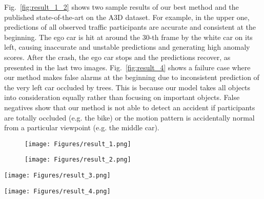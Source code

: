 \documentclass[letterpaper, 10 pt, conference]{ieeeconf}
\theoremstyle{definition}
\theoremstyle{remark}
\begin{document}
Fig.~\ref{fig:result_1_2} shows
two sample results of our best method and the published state-of-the-art on the A3D
dataset. For example, in the upper one, predictions of all observed
traffic participants are accurate and consistent at the beginning.
The ego car is hit at around the $30$-th frame by the white car on its
left, causing inaccurate and unstable predictions and generating
high anomaly scores. After the crash, the ego car stops and the
predictions recover, as presented in the last two images. Fig.~\ref{fig:result_4} 
shows a failure case where our method makes false alarms at the beginning
due to inconsistent prediction of the very left car occluded by trees.
This is because our model takes all objects into consideration equally rather than focusing on important objects. False negatives show that our method is not able to detect an accident
if participants are totally occluded (e.g. the bike) or the motion pattern is accidentally normal from a particular viewpoint (e.g. the middle car).

\begin{figure*}
    \vspace{5pt}
    \center
    \begin{subfigure}[htb]{1.0\textwidth}
        \center
        \texttt{[image: Figures/result\_1.png]}
        \vspace{1pt}
        \label{fig:result_1}
    \end{subfigure}
    \begin{subfigure}[htb]{1.0\textwidth}
        \center
        \texttt{[image: Figures/result\_2.png]}
        \vspace{1pt}
        \label{fig:result_2}
    \end{subfigure}
    \caption{
        Two examples of our best method and a state-of-the-art method on the A3D dataset.
        }
    \label{fig:result_1_2}
\end{figure*}

\begin{figure*}[htb]
    \center
    \texttt{[image: Figures/result\_3.png]}
    \vspace{-2pt}
    \caption{
        An example of our best method and a state-of-the-art method on the SA dataset\cite{chan2016anticipating}.
    }
    \vspace{-10pt}
    \label{fig:result_3}
\end{figure*}

\begin{figure*}[t]
    \center
    \texttt{[image: Figures/result\_4.png]}
    \vspace{-2pt}
    \caption{
         A failure case of our method on the A3D dataset with false alarms and false negatives.
    }
    \vspace{-10pt}
    \label{fig:result_4}
\end{figure*}
\end{document}
